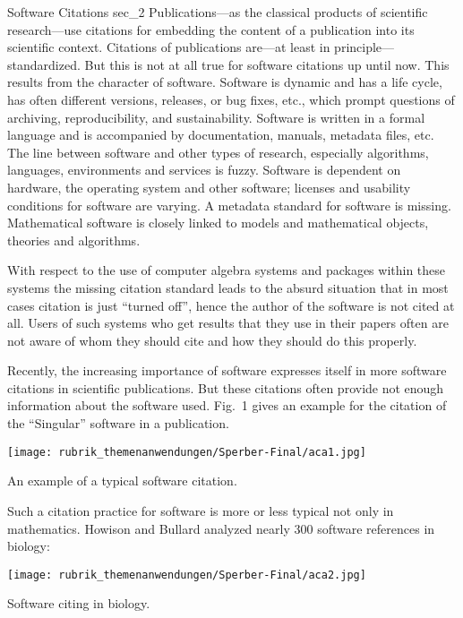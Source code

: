 \documentclass[a4paper,11pt]{article}
\begin{document}
\begin{multicols}{2}
\Ueberschrift
{Software Citations}
{sec_2}
Publications---as the classical products of scientific research---use citations for embedding the content of a publication into its scientific context. Citations of publications are---at least in principle---standardized. But this is not at all true for software citations up until now. This results from the character of software. Software is dynamic and has a life cycle, has often different versions, releases, or bug fixes, etc., which prompt questions of archiving, reproducibility, and sustainability.  Software is written in a formal language and is accompanied by documentation, manuals, metadata files, etc. The line between software and other types of research, especially algorithms, languages, environments and services is fuzzy. Software is dependent on hardware, the operating system and other software; licenses and usability conditions for software are varying. A metadata standard for software is missing. Mathematical software is closely linked to models and mathematical objects, theories and algorithms.

With respect to the use of computer algebra systems and packages within these systems the missing citation standard leads to the absurd situation that in most cases citation is just ``turned off'', hence the author of the software is not cited at all. Users of such systems who get results that they use in their papers often are not aware of whom they should cite and how they should do this properly.

Recently, the increasing importance of software expresses itself in more software citations in scientific publications. But these citations often provide not enough information about the software used.  Fig.~1 gives an example for the citation of the ``Singular'' software in a publication.

\begin{figurehere}
 \centering
 \texttt{[image: rubrik\_themenanwendungen/Sperber-Final/aca1.jpg]}
 \caption{An example of a typical software citation.\label{abb_1}}
\end{figurehere}

Such a citation practice for software is more or less typical not only in mathematics. Howison and Bullard \cite{Howison&Bullard2015} analyzed nearly 300 software references in biology:

\begin{figurehere}
 \centering
 \texttt{[image: rubrik\_themenanwendungen/Sperber-Final/aca2.jpg]}
 \caption{Software citing in biology.\label{abb_2}}
\end{figurehere}


\end{multicols}
\end{document}
